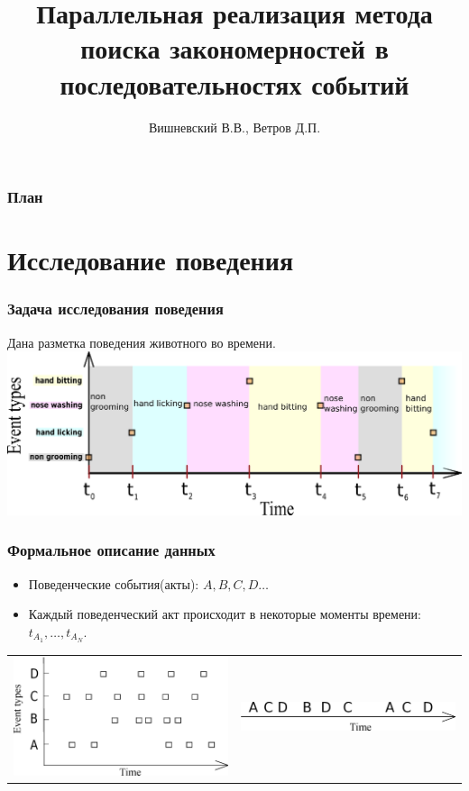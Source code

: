 \documentclass[smaller]{beamer}
\title[Patterns]{Параллельная реализация метода поиска закономерностей в последовательностях событий} %
\author %
[~]{Вишневский В.В., Ветров Д.П.}
\institute[Moscow State University] %
{
  \inst{1}
  Moscow State University
}
\begin{document}
\begin{frame}
  \titlepage
\end{frame}

\begin{frame}
  \frametitle{План}
  \tableofcontents
\end{frame}



\section{Исследование поведения}

\begin{frame}	
  \frametitle{Задача исследования поведения}
Дана разметка поведения животного во времени.
\includegraphics[scale=0.40]{beh_data.eps}
\end{frame}


\begin{frame}	
  \frametitle{Формальное описание данных}
\begin{itemize}
  \item Поведенческие события(акты): $A,B,C,D\dots$
  \item Каждый поведенческий акт происходит в некоторые моменты времени: $t_{A_1},\dots,t_{A_N}$. 
\end{itemize}
\begin{tabular}[t]{p{12em}|p{12em}}
    \includegraphics[scale=0.25]{NEWTS.eps} & \includegraphics[scale=0.25]{TSNEW2.eps}\\
\end{tabular}
\end{frame}
\end{document}
